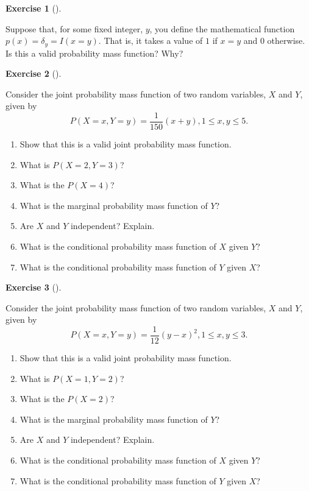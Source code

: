 \documentclass[
  letterpaper,
  DIV=11,
  numbers=noendperiod]{scrreprt}
\providecommand{\tightlist}{%
  \setlength{\itemsep}{0pt}\setlength{\parskip}{0pt}}\usepackage{longtable,booktabs,array}
\theoremstyle{definition}
\newtheorem{exercise}{Exercise}[chapter]
\theoremstyle{definition}
\theoremstyle{definition}
\theoremstyle{remark}
\begin{document}
\begin{exercise}[]\protect\hypertarget{exr-5.8}{}\label{exr-5.8}

Suppose that, for some fixed integer, \(y\), you define the mathematical
function \(p(x) = \delta_y = I(x = y)\). That is, it takes a value of
\(1\) if \(x = y\) and \(0\) otherwise. Is this a valid probability mass
function? Why?

\end{exercise}

\begin{exercise}[]\protect\hypertarget{exr-5.9}{}\label{exr-5.9}

Consider the joint probability mass function of two random variables,
\(X\) and \(Y\), given by
\[P(X=x, Y=y) = \frac{1}{150}(x + y), 1\leq x, y\leq 5.\]

\begin{enumerate}
\def\labelenumi{\alph{enumi}.}
\tightlist
\item
  Show that this is a valid joint probability mass function.
\item
  What is \(P(X = 2, Y = 3)\)?
\item
  What is the \(P(X = 4)\)?
\item
  What is the marginal probability mass function of \(Y\)?
\item
  Are \(X\) and \(Y\) independent? Explain.
\item
  What is the conditional probability mass function of \(X\) given
  \(Y\)?
\item
  What is the conditional probability mass function of \(Y\) given
  \(X\)?
\end{enumerate}

\end{exercise}

\begin{exercise}[]\protect\hypertarget{exr-5.10}{}\label{exr-5.10}

Consider the joint probability mass function of two random variables,
\(X\) and \(Y\), given by
\[P(X=x, Y=y) = \frac{1}{12}(y - x)^2, 1\leq x, y\leq 3.\]

\begin{enumerate}
\def\labelenumi{\alph{enumi}.}
\tightlist
\item
  Show that this is a valid joint probability mass function.
\item
  What is \(P(X = 1, Y = 2)\)?
\item
  What is the \(P(X = 2)\)?
\item
  What is the marginal probability mass function of \(Y\)?
\item
  Are \(X\) and \(Y\) independent? Explain.
\item
  What is the conditional probability mass function of \(X\) given
  \(Y\)?
\item
  What is the conditional probability mass function of \(Y\) given
  \(X\)?
\end{enumerate}

\end{exercise}
\end{document}
